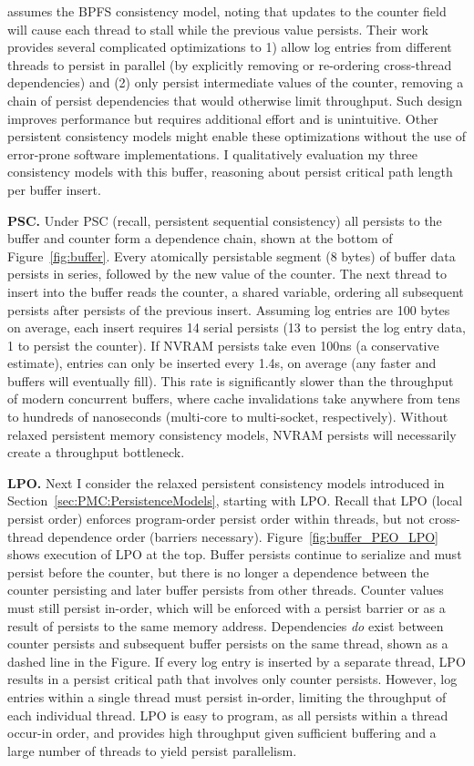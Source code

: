\cite{FangHsiao11} assumes the BPFS consistency model, noting that updates to the counter field will cause each thread to stall while the previous value persists.
Their work provides several complicated optimizations to 1) allow log entries from different threads to persist in parallel (by explicitly removing or re-ordering cross-thread dependencies) and (2) only persist intermediate values of the counter, removing a chain of persist dependencies that would otherwise limit throughput.
Such design improves performance but requires additional effort and is unintuitive.
Other persistent consistency models might enable these optimizations without the use of error-prone software implementations.
I qualitatively evaluation my three consistency models with this buffer, reasoning about persist critical path length per buffer insert.

\textbf{PSC.} Under PSC (recall, persistent sequential consistency) all persists to the buffer and counter form a dependence chain, shown at the bottom of Figure~\ref{fig:buffer}.
Every atomically persistable segment (8 bytes) of buffer data persists in series, followed by the new value of the counter.
The next thread to insert into the buffer reads the counter, a shared variable, ordering all subsequent persists after persists of the previous insert.
Assuming log entries are 100 bytes on average, each insert requires 14 serial persists (13 to persist the log entry data, 1 to persist the counter).
If NVRAM persists take even 100ns (a conservative estimate), entries can only be inserted every 1.4\textmu s, on average (any faster and buffers will eventually fill).
This rate is significantly slower than the throughput of modern concurrent buffers, where cache invalidations take anywhere from tens to hundreds of nanoseconds (multi-core to multi-socket, respectively).
Without relaxed persistent memory consistency models, NVRAM persists will necessarily create a throughput bottleneck.



\textbf{LPO.} Next I consider the relaxed persistent consistency models introduced in Section~\ref{sec:PMC:PersistenceModels}, starting with LPO.
Recall that LPO (local persist order) enforces program-order persist order within threads, but not cross-thread dependence order (barriers necessary).
Figure~\ref{fig:buffer_PEO_LPO} shows execution of LPO at the top.
Buffer persists continue to serialize and must persist before the counter, but there is no longer a dependence between the counter persisting and later buffer persists from other threads.
Counter values must still persist in-order, which will be enforced with a persist barrier or as a result of persists to the same memory address.
Dependencies \emph{do} exist between counter persists and subsequent buffer persists on the same thread, shown as a dashed line in the Figure.
If every log entry is inserted by a separate thread, LPO results in a persist critical path that involves only counter persists.
However, log entries within a single thread must persist in-order, limiting the throughput of each individual thread.
LPO is easy to program, as all persists within a thread occur-in order, and provides high throughput given sufficient buffering and a large number of threads to yield persist parallelism.

